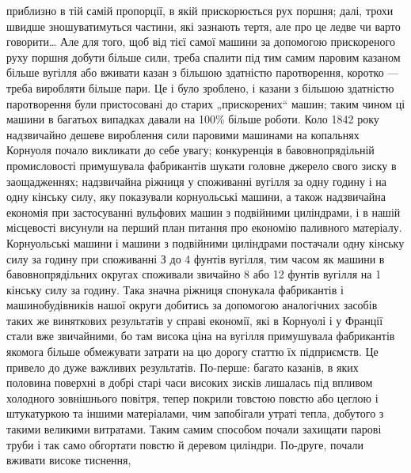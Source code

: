 приблизно в тій самій пропорції, в якій прискорюється рух поршня;
далі, трохи швидше зношуватимуться частини, які зазнають
тертя, але про це ледве чи варто говорити\dots{} Але для того, щоб
від тієї самої машини за допомогою прискореного руху поршня
добути більше сили, треба спалити під тим самим паровим казаном більше вугілля або вживати казан з
більшою здатністю паротворення, коротко — треба виробляти більше пари. Це і було
зроблено, і казани з більшою здатністю паротворення були пристосовані до старих „прискорених“ машин;
таким чином ці машини в багатьох випадках давали на 100\% більше роботи. Коло
1842 року надзвичайно дешеве вироблення сили паровими машинами на копальнях Корнуоля почало
викликати до себе увагу;
конкуренція в бавовнопрядільній промисловості примушувала
фабрикантів шукати головне джерело свого зиску в заощадженнях; надзвичайна ріжниця у споживанні
вугілля за одну годину
і на одну кінську силу, яку показували корнуольські машини,
а також надзвичайна економія при застосуванні вульфових машин
з подвійними циліндрами, і в нашій місцевості висунули на перший
план питання про економію паливного матеріалу. Корнуольські
машини і машини з подвійними циліндрами постачали одну кінську
силу за годину при споживанні З  до 4 фунтів вугілля, тим часом як машини в бавовнопрядільних
округах споживали звичайно 8 або 12 фунтів вугілля на 1 кінську силу за годину.
Така значна ріжниця спонукала фабрикантів і машинобудівників
нашої округи добитись за допомогою аналогічних засобів таких же
виняткових результатів у справі економії, які в Корнуолі і у Франції стали вже звичайними, бо там
висока ціна на вугілля примушувала фабрикантів якомога більше обмежувати затрати на цю дорогу статтю
їх підприємств. Це привело до дуже важливих результатів. По-перше: багато казанів, в яких половина
поверхні в добрі
старі часи високих зисків лишалась під впливом холодного зовнішнього повітря, тепер покрили товстою
повстю або цеглою і штукатуркою та іншими матеріалами, чим запобігали утраті тепла,
добутого з такими великими витратами. Таким самим способом
почали захищати парові труби і так само обгортати повстю й деревом циліндри. По-друге, почали
вживати високе тиснення,
\parbreak{}  %
